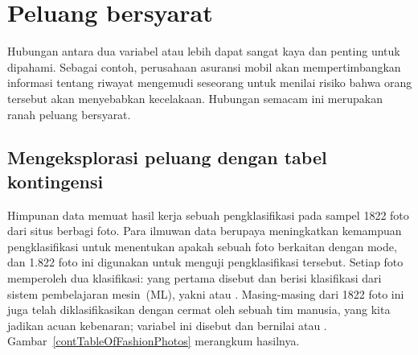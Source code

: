 \section{Peluang bersyarat}
\label{conditionalProbabilitySection}

Hubungan antara dua variabel atau lebih dapat sangat kaya
dan penting untuk dipahami.
Sebagai contoh, perusahaan asuransi mobil akan mempertimbangkan
informasi tentang riwayat mengemudi seseorang untuk menilai
risiko bahwa orang tersebut akan menyebabkan kecelakaan.
Hubungan semacam ini merupakan ranah
peluang bersyarat.


\subsection{Mengeksplorasi peluang dengan tabel kontingensi}


\newcommand{\fashN}{1822}
\newcommand{\fashYY}{197}
\newcommand{\fashYN}{22}
\newcommand{\fashYA}{219}
\newcommand{\fashNY}{112}
\newcommand{\fashNN}{1491}
\newcommand{\fashNA}{1603}
\newcommand{\fashAY}{309}
\newcommand{\fashAN}{1513}
\newcommand{\fashAA}{\fashN{}}
\newcommand{\fashCYPY}{0.96}
\newcommand{\fashCYPN}{0.04}
\newcommand{\fashCNPY}{0.07}
\newcommand{\fashCNPN}{0.93}

Himpunan data  memuat hasil kerja
sebuah pengklasifikasi pada sampel \fashN{} foto dari situs berbagi foto.
Para ilmuwan data berupaya meningkatkan kemampuan pengklasifikasi
untuk menentukan apakah sebuah foto berkaitan dengan mode, dan 1.822 foto ini
digunakan untuk menguji pengklasifikasi tersebut.
Setiap foto memperoleh dua klasifikasi:
yang pertama disebut  dan berisi
klasifikasi dari sistem pembelajaran
mesin~(ML), yakni
 atau .
Masing-masing dari \fashN{} foto ini juga telah diklasifikasikan dengan cermat
oleh sebuah tim manusia, yang kita jadikan acuan kebenaran;
variabel ini disebut  dan bernilai
 atau .
Gambar~\ref{contTableOfFashionPhotos} merangkum hasilnya.

